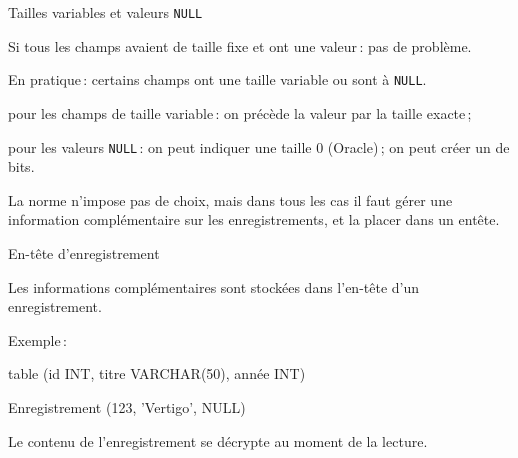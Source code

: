 \begin{frame}{Tailles variables et valeurs {\tt NULL}}

Si tous les champs avaient de taille fixe et ont
une valeur\,: pas de problème.

\vfill

En pratique\,: certains champs ont une taille variable
ou sont à {\tt NULL}.

\vfill

\begin{redbullet}
  \item pour les champs de taille variable\,: on précède
           la valeur par la taille exacte\,;

  \item  pour les valeurs {\tt NULL}\,:
    on peut indiquer une taille 0 (Oracle)\,;
      on peut créer un  de bits.
\end{redbullet}

\vfill
\begin{blocgauche}
La norme n'impose pas de choix, mais dans tous
les cas il faut gérer une \alert{information
complémentaire} sur les enregistrements, et
la placer dans un \alert{entête}.
\end{blocgauche}
\end{frame}

\begin{frame}{En-tête d'enregistrement}

Les informations complémentaires sont stockées
dans l'en-tête d'un enregistrement. 

\vfill
Exemple\,:  
\begin{redbullet}
  \item table  (id INT, titre VARCHAR(50), année INT)
   \item Enregistrement (123, 'Vertigo', NULL)
\end{redbullet}

\vfill


\vfill

\begin{blocgauche}
Le contenu de l'enregistrement se décrypte 
au moment de la lecture.
\end{blocgauche}
\end{frame}

